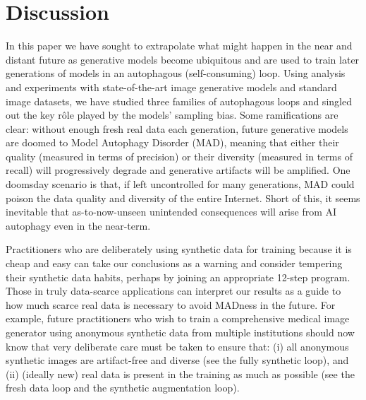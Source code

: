 \documentclass{article}
\def\colorSynthetic{colorA}
\def\colorMixed{colorB}
\def\colorFresh{colorC}
\def\synthetic{\textcolor{\colorSynthetic}{fully synthetic loop}}
\def\mixed{\textcolor{\colorMixed}{synthetic augmentation loop}}
\def\fresh{\textcolor{\colorFresh}{fresh data loop}}
\begin{document}
\section{Discussion}
\label{sec:discussion}


In this paper we have sought to extrapolate what might happen in the near and distant future as generative models become ubiquitous and are used to train later generations of models in an autophagous (self-consuming) loop.
%
Using analysis and experiments with state-of-the-art image generative models and standard image datasets, we have studied three families of autophagous loops and singled out the key r\^{o}le played by the models' sampling bias.
%
Some ramifications are clear: without enough fresh real data each generation, future generative models are doomed to Model Autophagy Disorder (MAD), meaning that either their quality (measured in terms of precision) or their diversity (measured in terms of recall) will progressively degrade and generative artifacts will be amplified.
%
One doomsday scenario is that, if left uncontrolled for many generations, MAD could poison the data quality and diversity of the entire Internet.
%
Short of this, it seems inevitable that as-to-now-unseen unintended consequences will arise from AI autophagy even in the near-term.


Practitioners who are deliberately using synthetic data for training because it is cheap and easy can take our conclusions as a warning and consider tempering their synthetic data habits, perhaps by joining an appropriate 12-step program.
%
Those in truly data-scarce applications can interpret our results as a guide to how much scarce real data is necessary to avoid MADness in the future.
%
For example, future practitioners who wish to train a comprehensive medical image generator using anonymous synthetic data from multiple institutions \cite{overcoming_barriers_to_data_sharing, generation_of_anonymous_chest} should now know that very deliberate care must be taken to ensure that: (i) all anonymous synthetic images are artifact-free and diverse (see the \synthetic{}), and (ii) (ideally new) real data is present in the training as much as possible (see the \fresh{} and the \mixed{}).
\end{document}
